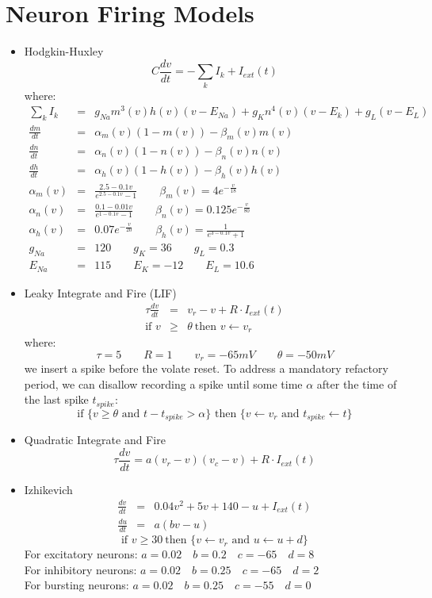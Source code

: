 \documentclass[a4paper,10pt]{article}
\begin{document}
\section{Neuron Firing Models}
\begin{itemize}
  \item Hodgkin-Huxley
  $$
  \boxed{C\frac{dv}{dt} = -\sum_k I_k + I_{ext}(t)}
  $$
  where:
  \begin{eqnarray*}
  \sum_k I_k & = & g_{Na} m^3(v) h(v) (v - E_{Na}) + g_{K} n^4(v) (v - E_k) + g_L(v - E_L) \\
  \frac{dm}{dt} & = & \alpha_m (v)( 1 - m(v) ) - \beta_m (v) m(v) \\
  \frac{dn}{dt} & = & \alpha_n (v)( 1 - n(v) ) - \beta_n (v) n(v) \\
  \frac{dh}{dt} & = & \alpha_h (v)( 1 - h(v) ) - \beta_h (v) h(v) \\
  \alpha_m (v) &=& \frac{2.5 - 0.1v}{e^{2.5-0.1v} - 1} \qquad \beta_m (v) = 4e^{-\frac{v}{18}} \\
  \alpha_n (v) &=& \frac{0.1 - 0.01v}{e^{1-0.1v} - 1} \qquad \beta_n (v) = 0.125e^{-\frac{v}{80}} \\
  \alpha_h (v) &=& 0.07e^{-\frac{v}{20}} \qquad \beta_h (v) = \frac{1}{e^{3 - 0.1v} + 1} \\
  g_{Na} & = & 120 \qquad g_K = 36 \qquad g_L = 0.3 \\
  E_{Na} & = & 115 \qquad E_K = -12 \qquad E_L = 10.6
  \end{eqnarray*}

  \item Leaky Integrate and Fire (LIF)
  \begin{eqnarray*}
  \tau \frac{dv}{dt} &=& v_r - v + R \cdot I_{ext}(t) \\
  \text{if } v &\geq& \theta \: \text{then } v \leftarrow v_r
  \end{eqnarray*}
  where:
  $$
  \tau = 5 \qquad R = 1 \qquad v_r = -65mV \qquad \theta = -50mV
  $$
  we insert a spike before the volate reset.  To address a mandatory refactory period,  we can disallow recording a spike until some time $\alpha$ after the time of the last spike $t_{spike}$:
  $$
  \text{if  } \{v \geq \theta \text{  and  } t - t_{spike} > \alpha\} \text{  then  } \{v \leftarrow v_r \text{  and  } t_{spike}\leftarrow t\}
  $$
  \item Quadratic Integrate and Fire
  $$
  \tau \frac{dv}{dt} = a (v_r - v)(v_c - v) + R\cdot I_{ext}(t)
  $$
  \item Izhikevich
  \begin{eqnarray*}
  \frac{dv}{dt} &=& 0.04v^2 + 5v + 140 - u + I_{ext}(t) \\
  \frac{du}{dt} &=& a(bv - u)
  \end{eqnarray*}
  $$
  \text{if } v \geq 30 \: \text{then } \{v \leftarrow v_r\text{  and  } u \leftarrow u + d\}
  $$
  For excitatory neurons: $a = 0.02 \quad b = 0.2 \quad c = -65 \quad d = 8$ \\
  For inhibitory neurons: $a = 0.02 \quad b = 0.25 \quad c = -65 \quad d = 2$ \\
  For bursting neurons: $a = 0.02 \quad b = 0.25 \quad c = -55 \quad d = 0$ \\
\end{itemize}
\end{document}
